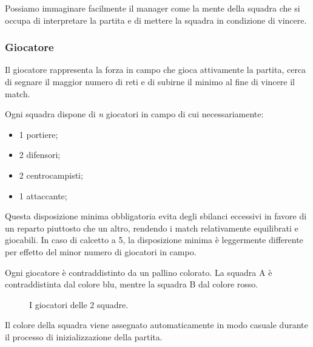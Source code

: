 \documentclass[aps,letterpaper,10pt]{article}
\begin{document}
Possiamo immaginare facilmente il manager come la mente della squadra che si occupa di interpretare la partita e di
mettere la squadra in condizione di vincere.

\subsubsection{Giocatore}

Il giocatore rappresenta la forza in campo che gioca attivamente la partita, cerca di segnare il maggior numero di reti
e di subirne il minimo al fine di vincere il match. \vspace{3mm}

Ogni squadra dispone di \emph{n} giocatori in campo di cui necessariamente:

\begin{itemize}
	\item 1 portiere;
	\item 2 difensori;
	\item 2 centrocampisti;
	\item 1 attaccante;
\end{itemize}

Questa disposizione minima obbligatoria evita degli sbilanci eccessivi in favore di un reparto piuttosto che un altro,
rendendo i match relativamente equilibrati e giocabili. In caso di calcetto a 5, la disposizione minima \`e leggermente
differente per effetto del minor numero di giocatori in campo. \vspace{3mm}

Ogni giocatore \`e contraddistinto da un pallino colorato. La squadra A \`e contraddistinta dal colore blu, mentre la
squadra B dal colore rosso.

\begin{figure}[H]
  \centering
    \hspace{1cm}             
  \caption{I giocatori delle 2 squadre.}
\end{figure}

Il colore della squadra viene assegnato automaticamente in modo casuale durante il processo di inizializzazione della
partita.
\end{document}
